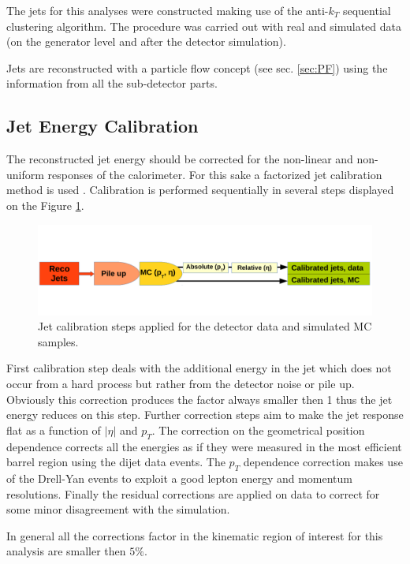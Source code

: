 The jets for this analyses were constructed making use of the anti-$k_{T}$ sequential clustering algorithm. The procedure was carried out with real and
simulated data (on the generator level and after the detector simulation).

Jets are reconstructed with a particle flow concept (see sec. \ref{sec:PF}) using the information from all the sub-detector parts.

\subsection{Jet Energy Calibration}\label{ssec:JCal}

The reconstructed jet energy should be corrected for the non-linear and non-uniform responses of the calorimeter. For this sake a factorized jet calibration
method is used \cite{2011JInst...611002C}. Calibration is performed sequentially in several steps displayed on the Figure \ref{fig:JECsc}.

\begin{figure}[h]
  \centering
  \includegraphics[width=1.0\textwidth]{04_event_reconstruction/plots/JEC.pdf}
  \caption{Jet calibration steps applied for the detector data and simulated MC samples.}
  \label{fig:JECsc}
\end{figure}

First calibration step deals with the additional energy in the jet which does not occur from a hard process but rather from the detector noise or pile up. 
Obviously this correction produces the factor always smaller then 1 thus the jet energy reduces on this step. Further correction steps aim to make the jet response
flat as a function of $|\eta|$ and $p_{T}$. The correction on the geometrical position dependence corrects all the energies as if they were measured 
in the most efficient barrel region using the dijet data events. The $p_{T}$ dependence correction makes use of the Drell-Yan events to exploit a good
lepton energy and momentum resolutions. Finally the residual corrections are applied on data to correct for some minor disagreement with the simulation.

In general all the corrections factor in the kinematic region of interest for this analysis are smaller then $5\%$.

